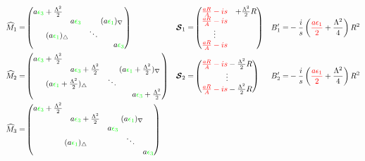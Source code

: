 \documentclass[aps,prd,onecolumn
,tightenlines,letterpaper,
notitlepage,11pt,linenumbers,
nofootinbib]{revtex4-1}
\begin{document}
\begin{align*}
\cM_1 =&
\begin{pmatrix}
a\green{\epsilon_3}+\frac{\Lambda^2}{2} & & & \\ 
& a\green{\epsilon_3} & &\multicolumn{2}{l}{\!\!\!\!(a\green{\epsilon_1})_\nabla} \\
 \multicolumn{2}{c}{(a\green{\epsilon_1})_\triangle} & \ddots & \\
  & & & & a\green{\epsilon_3} \\
\end{pmatrix}
&
\ve{\cS}_1 =&\begin{pmatrix}\red{\frac{aR}{A}-is}&+\frac{\Lambda^2}{2}R\\\red{\frac{aR}{A}-is}&\\\vdots&\\\red{\frac{aR}{A}-is}&\end{pmatrix}
&
B'_1=&-\frac{i}{s}\left(\red{\frac{a\epsilon_1}{2}}+\frac{\Lambda^2}{4}\right)R^2
\\
\cM_2 =&
\begin{pmatrix}
a\green{\epsilon_3}+\frac{\Lambda^2}{2} & & & \\ 
& a\green{\epsilon_3}+\frac{\Lambda^2}{2} & &\multicolumn{2}{l}{\!\!\!\!(a\green{\epsilon_1}+\frac{\Lambda^2}{2})_\nabla} \\
 \multicolumn{2}{c}{(a\green{\epsilon_1}+\frac{\Lambda^2}{2})_\triangle} & \ddots & \\
  & & & & a\green{\epsilon_3}+\frac{\Lambda^2}{2} \\
\end{pmatrix}
&
\ve{\cS}_2 =&\begin{pmatrix}\red{\frac{aR}{A}-is}-\frac{\Lambda^2}{2}R\\ \vdots\\
\red{\frac{aR}{A}-is}-\frac{\Lambda^2}{2}R\end{pmatrix}
&
B'_2=&-\frac{i}{s}\left(\red{\frac{a\epsilon_1}{2}}+\frac{\Lambda^2}{4}\right)R^2
\\
\cM_3 =&
\begin{pmatrix}
a\green{\epsilon_3}+\frac{\Lambda^2}{2} & & & &\\ 
& a\green{\epsilon_3}+\frac{\Lambda^2}{2} & &\multicolumn{2}{l}{\!\!\!\!(a\green{\epsilon_1})_\nabla} \\
&& a\green{\epsilon_3} &&\\
 \multicolumn{3}{c}{(a\green{\epsilon_1})_\triangle} & \ddots & \\
  & & & & a\green{\epsilon_3}
\end{pmatrix}

\end{align*}
\end{document}
